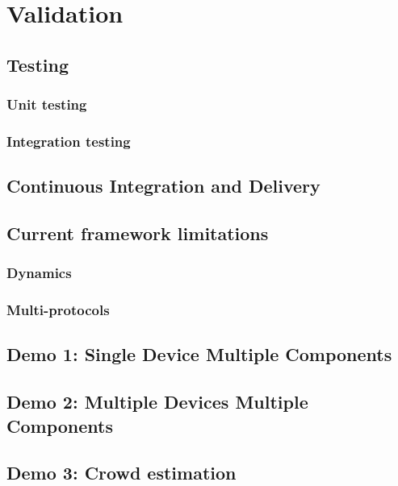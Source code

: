 \chapter{Validation} %
\label{chap:validation}

\section{Testing}
\label{sec:testing}

\subsection{Unit testing}
\label{sec:unit-testing}

\subsection{Integration testing}
\label{sec:integration-testing}

\section{Continuous Integration and Delivery}
\label{sec:ci-cd}

\section{Current framework limitations}
\label{sec:framework-limitations}

\subsection{Dynamics}
\label{sec:dynamics}

\subsection{Multi-protocols}
\label{sec:multi-protocols}

\section{Demo 1: Single Device Multiple Components}
\label{sec:demo-1}

\section{Demo 2: Multiple Devices Multiple Components}
\label{sec:demo-2}

\section{Demo 3: Crowd estimation}
\label{sec:demo-3}
